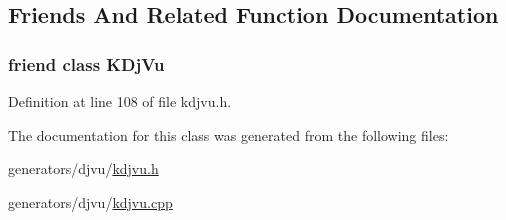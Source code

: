 \subsection{Friends And Related Function Documentation}
\hypertarget{classKDjVu_1_1UrlLink_a4241ce0336d22245ffdb13dd5cb6edcc}{
\subsubsection[{K\+Dj\+Vu}]{\setlength{\rightskip}{0pt plus 5cm}friend class {\bf K\+Dj\+Vu}\hspace{0.3cm}{\ttfamily [friend]}}}\label{classKDjVu_1_1UrlLink_a4241ce0336d22245ffdb13dd5cb6edcc}


Definition at line 108 of file kdjvu.\+h.



The documentation for this class was generated from the following files\+:\begin{DoxyCompactItemize}
\item 
generators/djvu/\hyperlink{kdjvu_8h}{kdjvu.\+h}\item 
generators/djvu/\hyperlink{kdjvu_8cpp}{kdjvu.\+cpp}\end{DoxyCompactItemize}
